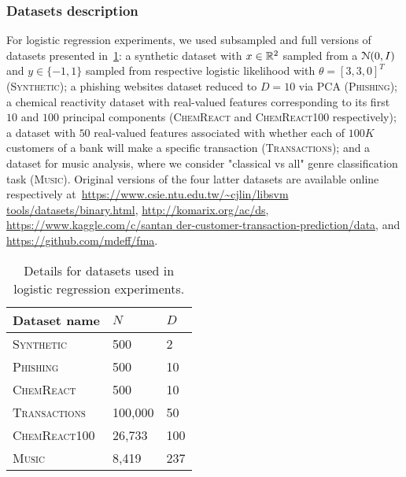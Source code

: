 \subsubsection{Datasets description}
\label{app:logreg_data_details}
For logistic regression experiments, we used subsampled and full versions of datasets presented in~\cref{table:datasets_details}: a synthetic dataset with $ x\in \mathbb{R}^2 $ sampled \iid from a $\mathcal{N}{(0, I)}$ and $ y\in\{-1,1\} $ sampled from respective logistic likelihood with $ \theta =[3, 3, 0]^T$ (\textsc{Synthetic}); a phishing websites dataset reduced to $ D=10 $ via PCA (\textsc{Phishing}); a chemical reactivity dataset with  real-valued features corresponding to its first $ 10 $ and $ 100 $ principal components (\textsc{ChemReact} and \textsc{ChemReact100} respectively); a dataset with $ 50 $ real-valued features associated with whether each of $ 100K $ customers of a bank will make a specific transaction (\textsc{Transactions}); and a dataset for music analysis, where we consider "classical vs all" genre classification task (\textsc{Music}). Original versions of the four latter datasets are available online respectively at~\href{https://www.csie.ntu.edu.tw/~cjlin/libsvmtools/datasets/binary.html}{https://www.csie.ntu.edu.tw/\~{}cjlin/libsvm tools/datasets/binary.html},  \href{http://komarix.org/ac/ds/}{http://komarix.org/ac/ds},  \href{https://www.kaggle.com/c/santander-customer-transaction-prediction/data}{https://www.kaggle.com/c/santan der-customer-transaction-prediction/data}, and \href{https://github.com/mdeff/fma}{https://github.com/mdeff/fma}. 

\begin{table}[!h]
	\begin{center}
		\begin{tabular}{|l|l|l|}
			\hline
			\textbf{Dataset name}       & $N$      & $D$   \\ \hline
			\textsc{Synthetic}  & 500    & 2   \\ \hline
			\textsc{Phishing}   & 500    & 10  \\ \hline
			\textsc{ChemReact}        & 500    & 10  \\ \hline
			\textsc{Transactions}  & 100,000   & 50   \\ \hline
			\textsc{ChemReact100}    & 26,733 & 100 \\ \hline
			\textsc{Music}      & 8,419    & 237 \\ \hline
		\end{tabular}
	\end{center}
	\caption{Details for datasets used in logistic regression experiments.}
	\label{table:datasets_details}
\end{table}

